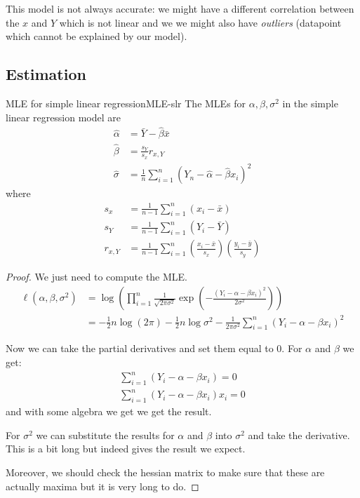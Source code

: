 \documentclass[12pt]{extarticle}
\begin{document}
This model is not always accurate: we might have a different correlation between the $x$ and $Y$ which is not linear
and we we might also have \emph{outliers} (datapoint which cannot be explained by our model).

\subsection{Estimation}

\begin{theorem}{MLE for simple linear regression}{MLE-slr}
	The MLEs for $\alpha, \beta, \sigma^2$ in the simple linear regression model are
	\begin{align}
		\hat \alpha & = \bar Y - \hat \beta \bar x                                       \\
		\hat \beta  & = \frac{s_Y}{s_x} r_{x, Y}                                         \\
		\hat \sigma & = \frac{1}{n} \sum_{i = 1}^n (Y_n - \hat \alpha- \hat \beta x_i)^2
	\end{align}
	where
	\begin{align}
		s_x      & = \frac{1}{n - 1} \sum^n_{i = 1}(x_i - \bar x)                                                              \\
		s_Y      & = \frac{1}{n - 1} \sum^n_{i = 1}(Y_i - \bar Y)                                                              \\
		r_{x, Y} & = \frac{1}{n - 1} \sum^n_{i = 1}\left(\frac{x_i - \bar x}{s_x}\right) \left(\frac{y_i - \bar y}{s_y}\right)
	\end{align}
\end{theorem}

\begin{proof}
	We just need to compute the MLE.
	\begin{align}
		\ell(\alpha, \beta, \sigma^2) & = \log\left( \prod_{i = 1}^n \frac{1}{\sqrt{2 \pi \sigma ^2}} \exp \left( - \frac{(Y_i - \alpha - \beta x_i)^2}{2 \sigma^2} \right) \right) \\
		                              & = -\frac{1}{2} n \log(2 \pi) - \frac{1}{2} n \log \sigma^2 - \frac{1}{2 \pi \sigma ^2} \sum_{i = 1}^n  (Y_i - \alpha - \beta x_i)^2
	\end{align}

	Now we can take the partial derivatives and set them equal to 0.
	For $\alpha$ and $\beta$ we get:
	\begin{gather}
		\sum_{i = 1}^n  (Y_i - \alpha - \beta x_i) = 0 \\
		\sum_{i = 1}^n  (Y_i - \alpha - \beta x_i) x_i = 0
	\end{gather}
	and with some algebra we get we get the result.

	For $\sigma^2$ we can substitute the results for $\alpha$ and $\beta$ into $\sigma^2$
	and take the derivative.
	This is a bit long but indeed gives the result we expect.

	Moreover, we should check the hessian matrix to make sure that these are actually maxima but it is very long to do.
\end{proof}
\end{document}
